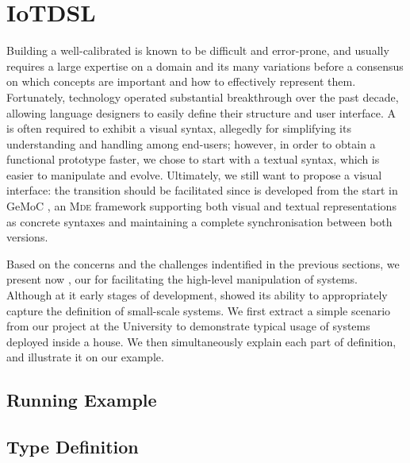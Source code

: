 \section{IoTDSL}
\label{sec:IoTDSL}

Building a well-calibrated \DSL is known to be difficult and error-prone, and usually requires a large expertise on a domain and its many variations before a consensus on which concepts are important and how to effectively represent them. Fortunately, \MDE technology operated substantial breakthrough over the past decade, allowing language designers to easily define their \DSL structure and user interface. A \DSL is often required to exhibit a visual syntax, allegedly for simplifying its understanding and handling among end-users; however, in order to obtain a functional prototype faster, we chose to start with a textual syntax, which is easier to manipulate and evolve. Ultimately, we still want to propose a visual interface: the transition should be facilitated since \IOTDSL is developed from the start in GeMoC \cite{}, an \textsc{Mde} framework supporting both visual and textual representations as concrete syntaxes and maintaining a complete synchronisation between both versions.

Based on the concerns and the challenges indentified in the previous sections, we present now \IOTDSL, our \DSL for facilitating the high-level manipulation of \IOT systems. Although at it early stages of development, \IOTDSL showed its ability to appropriately capture the definition of small-scale \IOT systems. We first extract a simple scenario from our project at the University to demonstrate typical usage of \IOT systems deployed inside a house. We then simultaneously explain each part of \IOTDSL definition, and illustrate it on our example.

\subsection{Running Example}
\label{sec:IoTDSL-Example}




\subsection{Type Definition}
\label{sec:IoTDSL-Type}

